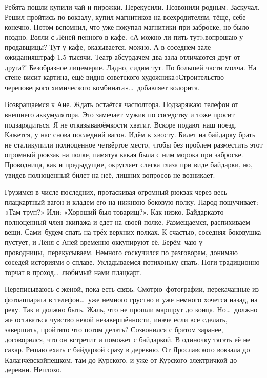 Ребята пошли купили чай и пирожки. Перекусили. Позвонили родным. Заскучал. Решил пройтись по вокзалу, купил магнитиков на всех\mdash родителям, тёще, себе конечно. Потом вспомнил, что уже покупал магнитики при заброске, но было поздно. Взяли с Лёней пенного в кафе. «А можно ли пить тут»,\mdash вопрошаю у продавщицы? Тут у кафе, оказывается, можно. А в соседнем зале ожидания\mdash штраф 1.5 тысячи. Театр абсурда\mdash чем два зала отличаются друг от друга?! Безобразное лицемерие. Ладно, сидим тут. По большей части молча. На стене висит картина, ещё видно советского художника\mdash «Строительство череповецкого химического комбината»\ldots~добавляет колорита. 

Возвращаемся к Ане. Ждать остаётся час\sdash полтора. Подзаряжаю телефон от внешнего аккумулятора. Это замечает мужик по соседству и тоже просит подзарядиться. Я не отказываю\mdash ёмкости хватит. Вскоре подают наш поезд. Кажется, у нас снова последний вагон. Идём к хвосту. Билет на байдарку брать не стали\mdash купили полноценное четвёртое место, чтобы без проблем разместить этот огромный рюкзак на полке, памятуя какая была с ним морока при заброске. Проводница, как и предыдущие, округляет слегка глаза при виде байдарки, но, увидев полноценный билет на неё, лишних вопросов не возникает.
 
Грузимся в числе последних, протаскивая огромный рюкзак через весь плацкартный вагон и кладем его на нижнюю боковую полку. Народ пошучивает: «Там труп?» Или: «Хороший был товарищ?». Как низко. Байдарка\mdash это полноценный член экипажа и едет на своей полке. Размещаемся, распихиваем вещи. Сами~будем спать на трёх верхних полках. К счастью, соседняя боковушка пустует, и Лёня с Аней временно оккупируют её. Берём~чаю у проводницы,~перекусываем. Немного соскучился по разговорам, донимаю соседей историями о сплаве. Укладываемся потихоньку спать. Ноги традиционно торчат в проход\ldots~любимый нами плацкарт.

Переписываюсь с женой, пока есть связь. Смотрю~фотографии, перекачанные из фотоаппарата в телефон\ldots~уже немного грустно и уже немного хочется назад, на реку. Так и должно быть. Жаль, что не прошли маршрут до конца. Но\ldots~должно же оставаться чувство некой незавершённости, иначе если все сделать, завершить, пройти\mdash то что потом делать? Созвонился с братом заранее, договорился, что он встретит и поможет с байдаркой. В одиночку тягать её не сахар. Решаю ехать с байдаркой сразу в деревню. От Ярославского вокзала до Каланчёвской\mdash пешком, там до Курского, и уже от Курского электричкой до деревни. Неплохо. 

